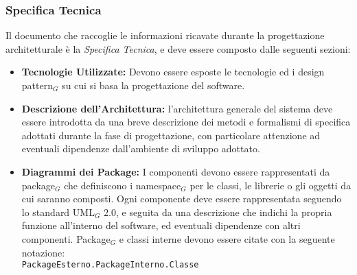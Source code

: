 \subsubsection{Specifica Tecnica}
Il documento che raccoglie le informazioni ricavate durante la progettazione architetturale è la \textit{Specifica Tecnica}, e deve essere composto dalle seguenti sezioni:
\begin{itemize}
\item \textbf{Tecnologie Utilizzate:} Devono essere esposte le tecnologie ed i design pattern$_G$ su cui si basa la progettazione del software.
\item \textbf{Descrizione dell'Architettura:} l'architettura generale del sistema deve essere introdotta da una breve descrizione dei metodi e formalismi di specifica adottati durante la fase di progettazione, con particolare attenzione ad eventuali dipendenze dall'ambiente di sviluppo adottato.
\item \textbf{Diagrammi dei Package:} I componenti devono essere rappresentati da package$_G$ che definiscono i namespace$_G$ per le classi, le librerie o gli oggetti da cui saranno composti. Ogni componente deve essere rappresentata seguendo lo standard UML$_G$ 2.0, e seguita da una descrizione che indichi la propria funzione all'interno del software, ed eventuali dipendenze con altri componenti. Package$_G$ e classi interne devono essere citate con la seguente notazione: \\
\verb|PackageEsterno.PackageInterno.Classe|


\end{itemize}
